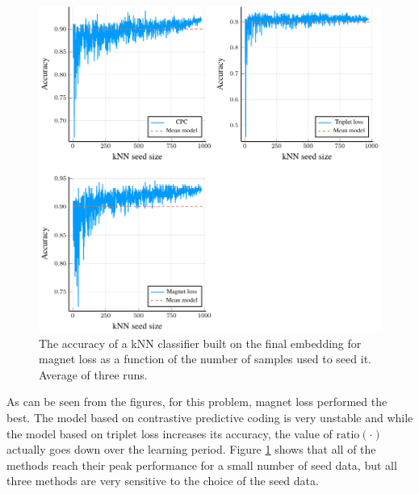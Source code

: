 \begin{figure}[h]
  \centering
  \includegraphics[width=\textwidth]{images/cisco/kNN/cisco-kNN.pdf}
  \caption{The accuracy of a kNN classifier built on the final embedding for magnet loss as a function of the number of samples used to seed it. Average of three runs.}\label{fig:cisco-kNN}
\end{figure}

As can be seen from the figures, for this problem, magnet loss performed the best. The model based on contrastive predictive coding is very unstable and while the model based on triplet loss increases its accuracy, the value of \( \mathrm{ratio} \left( \cdot \right) \) actually goes down over the learning period. Figure \ref{fig:cisco-kNN} shows that all of the methods reach their peak performance for a small number of seed data, but all three methods are very sensitive to the choice of the seed data.
